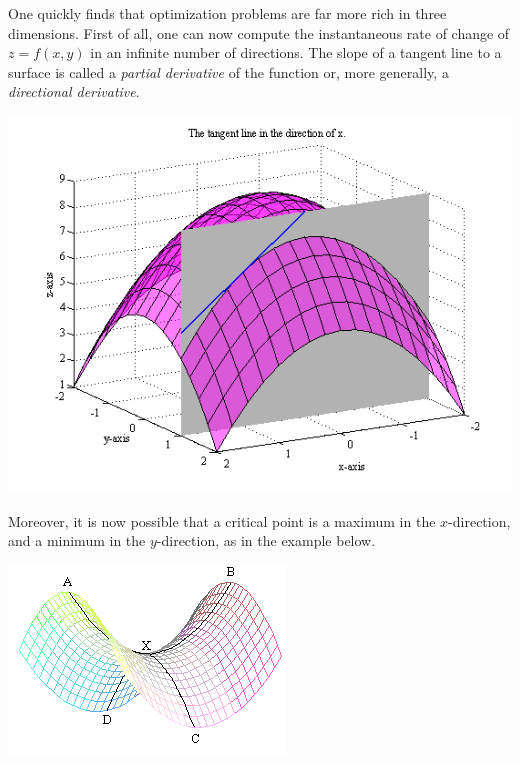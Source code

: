 \documentclass[12pt,letterpaper,reqno]{article}
\numberwithin{equation}{section}
\newcommand{\ti}[1]{\textit{#1}}
\begin{document}
One quickly finds that optimization problems are far more rich in three dimensions. First of all, one can now compute the instantaneous rate of change of $z=f(x,y)$ in an infinite number of directions. The  slope of a tangent line to a surface is called a  \ti{partial derivative} of the function or, more generally, a \ti{directional derivative}.
\begin{center}
	\includegraphics[scale=0.5]{figures_mvc/partial_derivative_2}
\end{center}
 Moreover, it is now possible that a critical point is a maximum in the $x$-direction, and a minimum in the $y$-direction, as in the example below.
\begin{center}
	\includegraphics[scale=0.5]{figures_mvc/saddle_point}
\end{center}
\end{document}
